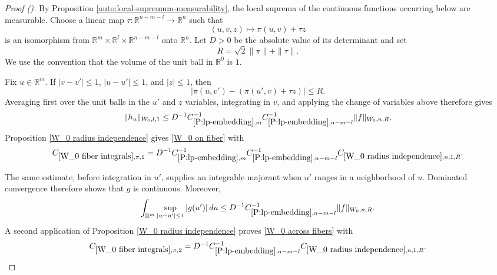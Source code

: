 \documentclass[12pt,reqno]{amsart}
\newcommand{\auto}{{({\tiny\faCar})}}
\theoremstyle{plain}
\numberwithin{equation}{section}
\theoremstyle{remark}
\newcommand{\R}{{\mathbb R}}
\begin{document}
\begin{proof}[Proof \auto]
By Proposition \ref{auto:local-supremum-measurability}, the local suprema of the continuous functions occurring below are measurable. Choose a linear map $\tau:\R^{n-m-l}\to\R^n$ such that
\[
(u,v,z)\longmapsto \pi(u,v)+\tau z
\]
is an isomorphism from $\R^m\times\R^l\times\R^{n-m-l}$ onto $\R^n$. Let $D>0$ be the absolute value of its determinant and set
\[
R=\sqrt{2}\|\pi\|+\|\tau\|.
\]
We use the convention that the volume of the unit ball in $\R^0$ is $1$.

Fix $u\in\R^m$. If $|v-v'|\le1$, $|u-u'|\le1$, and $|z|\le1$, then
\[
|\pi(u,v')-(\pi(u',v)+\tau z)|\le R.
\]
Averaging first over the unit balls in the $u'$ and $z$ variables, integrating in $v$, and applying the change of variables above therefore gives
\[
\|h_u\|_{W_0,l,1}
\le
D^{-1}C_{\ref{P:lp-embedding},m}^{-1}C_{\ref{P:lp-embedding},n-m-l}^{-1}
\|f\|_{W_0,n,R}.
\]
Proposition \ref{W_0 radius independence} gives \eqref{W_0 on fiber} with
\[
C_{\ref{W_0 fiber integrals},\pi,1}
=
D^{-1}C_{\ref{P:lp-embedding},m}^{-1}C_{\ref{P:lp-embedding},n-m-l}^{-1}
C_{\ref{W_0 radius independence},n,1,R}.
\]

The same estimate, before integration in $u'$, supplies an integrable majorant when $u'$ ranges in a neighborhood of $u$. Dominated convergence therefore shows that $g$ is continuous. Moreover,
\[
\int_{\R^m}\sup_{|u-u'|\le1}|g(u')|\,du
\le
D^{-1}C_{\ref{P:lp-embedding},n-m-l}^{-1}\|f\|_{W_0,n,R}.
\]
A second application of Proposition \ref{W_0 radius independence} proves \eqref{W_0 across fibers} with
\[
C_{\ref{W_0 fiber integrals},\pi,2}
=
D^{-1}C_{\ref{P:lp-embedding},n-m-l}^{-1}
C_{\ref{W_0 radius independence},n,1,R}.
\]
\end{proof}
\end{document}

